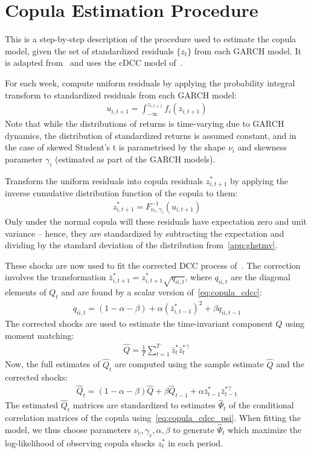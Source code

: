 
\section{Copula Estimation Procedure} %
\label{app:copula_cdcc}

This is a step-by-step description of the procedure used to estimate the copula model, given the set of standardized residuals $\{z_{t}\}$ from each GARCH model. It is adapted from~\textcite{ChristoffersenErrunzaJacobLanglois2012} and uses the cDCC model of~\textcite{Aielli2013}.

For each week, compute uniform residuals by applying the probability integral transform to standardized residuals from each GARCH model:
\begin{align}
  u_{i, t+1} = \int_{-\infty}^{z_{i,t+1}} f_{i}(z_{i,t+1})
\end{align}
Note that while the distributions of returns is time-varying due to GARCH dynamics, the distribution of standardized returns is assumed constant, and in the case of skewed Student's t is parametrised by the shape $\nu_i$ and skewness parameter $\gamma_i$ (estimated as part of the GARCH models).

Transform the uniform residuals into copula residuals $z_{i,t+1}^*$ by applying the inverse cumulative distribution function of the copula to them:
\begin{align}
  z_{i,t+1}^* = F_{\nu_c,\gamma_i}^{-1}(u_{i,t+1})
\end{align}
Only under the normal copula will these residuals have expectation zero and unit variance -- hence, they are standardized by subtracting the expectation and dividing by the standard deviation of the distribution from~\autoref{app:ghstmv}.

These shocks are now used to fit the corrected DCC process of~\textcite{Aielli2013}. The correction involves the transformation $\bar{z}_{i,t+1}^* = z_{i,t+1}^* \sqrt{q_{ii,t}}$, where $q_{ii,t}$ are the diagonal elements of $Q_t$ and are found by a scalar version of~\autoref{eq:copula_cdcc}:
\begin{align}
  q_{ii,t} = (1 - \alpha - \beta)
    + \alpha (\bar{z}_{i,t-1}^*)^2
    + \beta q_{ii,t-1}
\end{align}
The corrected shocks are used to estimate the time-invariant component $Q$ using moment matching:
\begin{align}
  \hat{Q} = \frac{1}{T} \sum_{t=1}^T \bar{z}_{t}^* \bar{z}_t^{*\top}
\end{align}
Now, the full estimates of $\hat{Q}_t$ are computed using the sample estimate $\hat{Q}$ and the corrected shocks:
\begin{align}
  \hat{Q}_t = (1 - \alpha - \beta) \hat{Q}
    + \beta \hat{Q}_{t-1}
    + \alpha \bar{z}_{t-1}^* \bar{z}_{t-1}^{*\top}
\end{align}
The estimated $\hat{Q}_t$ matrices are standardized to estimates $\hat{\Psi}_t$ of the conditional correlation matrices of the copula using~\autoref{eq:copula_cdcc_psi}. When fitting the model, we thus choose parameters $\nu_c, \gamma_c, \alpha, \beta$ to generate $\hat{\Psi}_t$ which maximize the log-likelihood of observing copula shocks $z_t^*$ in each period.

